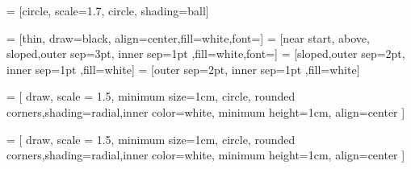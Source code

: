   =  [circle, scale=1.7, circle, shading=ball]
\newcommand\atoms{0}

\tikzset{anchor/.append code=\let\tikz@auto@anchor\relax}
\newcommand{\wog}{\color{blue} $w_{o_1}$}	%
\newcommand{\wogg}{\color{orange} $w_{o_2}$}
\newcommand{\whg}{\color{red} $w_{h_2}$}
\newcommand{\whgg}{$w_{h_1}$}
\newcommand{\wng}{$w_{n_1}$}
\newcommand{\wngg}{$w_{n_2}$}
\newcommand{\ide}{$1$} %

\newcommand{\fweight}{\color{cyan} $w_{f_1}$} %

  =  [thin, draw=black, align=center,fill=white,font=\small]
  =  [near start, above, sloped,outer sep=3pt, inner sep=1pt ,fill=white,font=\large]
  =  [sloped,outer sep=2pt, inner sep=1pt ,fill=white]
  =  [outer sep=2pt, inner sep=1pt ,fill=white]

 = [
  draw, scale = 1.5,  minimum size=1cm, circle, rounded corners,shading=radial,inner color=white,
  minimum height=1cm,
  align=center
  ]
  
 = [
  draw, scale = 1.5,  minimum size=1cm, circle, rounded corners,shading=radial,inner color=white,
  minimum height=1cm,
  align=center
  ]